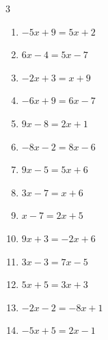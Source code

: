 \begin{multicols}{3}
\begin{enumerate}

  \item $-5x+9=5x+2$


  \item $6x-4=5x-7$

        \phantom{$\displaystyle x=-3$}

  \item $-2x+3=x+9$

        \phantom{$\displaystyle x=-2$}

  \item $-6x+9=6x-7$


\columnbreak %

  \item $9x-8=2x+1$


  \item $-8x-2=8x-6$


  \item $9x-5=5x+6$


  \item $3x-7=x+6$


  \item $x-7=2x+5$

        \phantom{$\displaystyle x=-12$}

  \item $9x+3=-2x+6$


  \item $3x-3=7x-5$


  \item $5x+5=3x+3$

        \phantom{$\displaystyle x=-1$}

  \item $-2x-2=-8x+1$


  \item $-5x+5=2x-1$


\end{enumerate}
\end{multicols}
